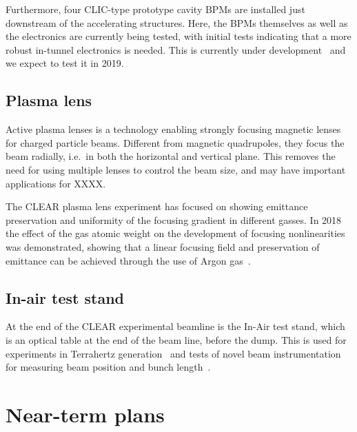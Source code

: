 \documentclass[a4paper,
               keeplastbox,   %
               ]{jacow}
\begin{document}

Furthermore, four CLIC-type prototype cavity BPMs are installed just downstream of the accelerating structures.
Here, the BPMs themselves as well as the electronics are currently being tested, with initial tests indicating that a more robust in-tunnel electronics is needed.
This is currently under development~\cite{AlexejLyapin::CLICWS19} and we expect to test it in 2019.

\subsection{Plasma lens}

Active plasma lenses is a technology enabling strongly focusing magnetic lenses for charged particle beams.
Different from magnetic quadrupoles, they focus the beam radially, i.e.\ in both the horizontal and vertical plane.
This removes the need for using multiple lenses to control the beam size, and may have important applications for XXXX.

The CLEAR plasma lens experiment has focused on showing emittance preservation and uniformity of the focusing gradient in different gasses.
In 2018 the effect of the gas atomic weight on the development of focusing nonlinearities was demonstrated, showing that a linear focusing field and preservation of emittance can be achieved through the use of Argon gas~\cite{CarlPRL}.


\subsection{In-air test stand}

At the end of the CLEAR experimental beamline is the In-Air test stand, which is an optical table at the end of the beam line, before the dump.
This is used for experiments in Terrahertz generation~\cite{CurcioPRAB} and tests of novel beam instrumentation for measuring beam position and bunch length~\cite{Thibaut::CLEARrev}.

\section{Near-term plans}
\end{document}

